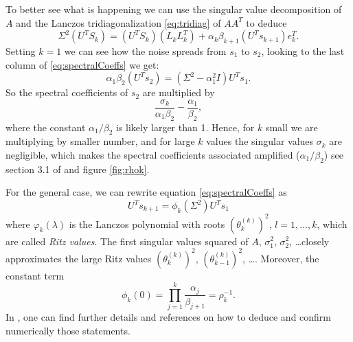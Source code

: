 \documentclass[11pt]{amsart}
\begin{document}
To better see what is happening we can use the singular value decomposition of
$A$ and the Lanczos tridiagonalization \eqref{eq:tridiag} of $AA^{T}$ to deduce
\begin{equation} \label{eq:spectralCoeffs}
  \Sigma^{2}(U^{T}S_{k}) = (U^{T}S_{k})(L_{k}L_{k}^{T}) + 
  \alpha_{k}\beta_{k+1}(U^{T}s_{k+1})e_{k}^{T}.
\end{equation}
Setting $k = 1$ we can see how the noise spreads from $s_{1}$ to $s_{2}$,
looking to the last column of \eqref{eq:spectralCoeffs} we get:
\begin{equation*}
  \alpha_{1}\beta_{2}(U^{T}s_{2}) = (\Sigma^{2} - \alpha_{1}^{2}I)U^{T}s_{1}.
\end{equation*}
So the spectral coefficients of $s_{2}$ are multiplied by
\begin{equation*}
  \frac{\sigma_{k}}{\alpha_{1}\beta_{2}} - \frac{\alpha_{1}}{\beta_{2}},
\end{equation*}
where the constant $\alpha_{1}/\beta_{2}$ is likely larger than 1. Hence, for 
$k$ small we are multiplying by smaller number, and for large $k$ values the
singular values $\sigma_{k}$ are negligible, which makes the spectral
coefficients associated amplified ($\alpha_{1}/\beta_{2}$) see section 3.1 of 
\cite{bidiagonalization} and figure \ref{fig:rhok}.

For the general case, we can rewrite equation \eqref{eq:spectralCoeffs} as
\begin{equation*}
  U^{T}s_{k+1} = \phi_{k}(\Sigma^{2})U^{T}s_{1}
\end{equation*}
where $\varphi_{k}(\lambda)$ is the Lanczos polynomial with roots 
$(\theta_{k}^{(k)})^{2}$, $l = 1,\ldots,k$, which are called \emph{Ritz values}.
The first singular values squared of $A$, $\sigma_{1}^{2}$, $\sigma_{2}^{2}$, 
\ldots closely approximates the large Ritz values 
$\left(\theta_{k}^{(k)}\right)^{2}$, $\left(\theta_{k-1}^{(k)}\right)^{2}$, 
\ldots. Moreover, the constant term
\begin{equation*}
  \phi_{k}(0) = \prod_{j=1}^{k}\frac{\alpha_{j}}{\beta_{j+1}} = \rho_{k}^{-1}.
\end{equation*}
In \cite{bidiagonalization}, one can find further details and references on how 
to deduce and confirm numerically those statements. 
\end{document}
